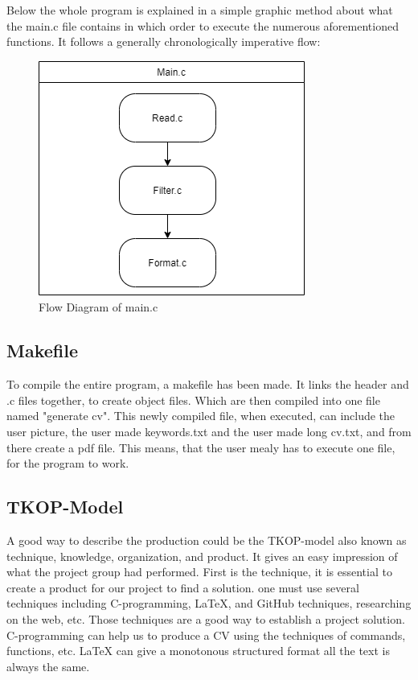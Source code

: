 Below the whole program is explained in a simple graphic method about what the main.c file contains 
in which order to execute the numerous aforementioned functions.
It follows a generally chronologically imperative flow:
\begin{figure}[H]
  \centering
  \includegraphics[scale = 0.6]{figures/main.png}
  \caption{Flow Diagram of main.c}
\end{figure}
\subsection{Makefile}
To compile the entire program, a makefile has been made. It links the header and .c files together, to create object files. Which are then compiled into one file named "generate cv".
This newly compiled file, when executed, can include the user picture, the user made keywords.txt and the user made long cv.txt, and from there create a pdf file.
This means, that the user mealy has to execute one file, for the program to work.

\subsection{TKOP-Model}
A good way to describe the production could be the TKOP-model also known as technique, knowledge, organization, and product.
It gives an easy impression of what the project group had performed.
First is the technique, it is essential to create a product for our project to find a solution. 
one must use several techniques including C-programming, LaTeX, and GitHub techniques, researching on the web, etc.
Those techniques are a good way to establish a project solution. C-programming can help us to produce a CV using the techniques
of commands, functions, etc. LaTeX can give a monotonous structured format all the text is always the same. \\

